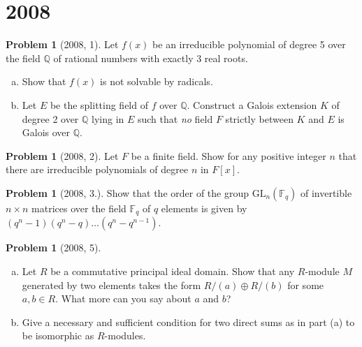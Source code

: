 \documentclass{article}
\newcommand{\<}{\langle} %
\renewcommand{\>}{\rangle} %
\theoremstyle{plain}
\theoremstyle{remark}
\theoremstyle{definition}
\newtheorem{examproblem}[equation]{Problem}
\begin{document}
\newpage

\section{2008}

\begin{examproblem}[2008, 1]
	Let $f(x)$ be an irreducible polynomial of degree 5 over the field
	$\mathbb Q$ of rational numbers with exactly 3 real roots.
	\begin{enumerate}[(a)]
		\item Show that $f(x)$ is not solvable by radicals.
		\item Let $E$ be the splitting field of $f$ over $\mathbb Q$.
			Construct a Galois extension $K$ of degree 2 over
			$\mathbb Q$ lying in $E$ such that \textit{no} field $F$
			strictly between $K$ and $E$ is Galois over $\mathbb Q$.
	\end{enumerate}
\end{examproblem}

\begin{examproblem}[2008, 2]
	Let $F$ be a finite field. Show for any positive integer $n$ that
	there are irreducible polynomials of degree $n$ in $F[x]$.
\end{examproblem}

\begin{examproblem}[2008, 3.]
	Show that the order of the group $\text{GL}_n(\mathbb F_q)$ of invertible
	$n\times n$ matrices over the field $\mathbb F_q$ of $q$ elements is given by
	$(q^n-1)(q^n-q)\dots(q^n-q^{n-1})$.
\end{examproblem}

\begin{examproblem}[2008, 5]
	\begin{enumerate}[(a)]
		\item Let $R$ be a commutative principal ideal domain. Show that
			any $R$-module $M$ generated by two elements takes the form
			$R/(a)\oplus R/(b)$ for some $a,b\in R$. What more
			can you say about $a$ and $b$?
		\item Give a necessary and sufficient condition for two direct sums
			as in part (a) to be isomorphic as $R$-modules.
	\end{enumerate}
\end{examproblem}
\end{document}
